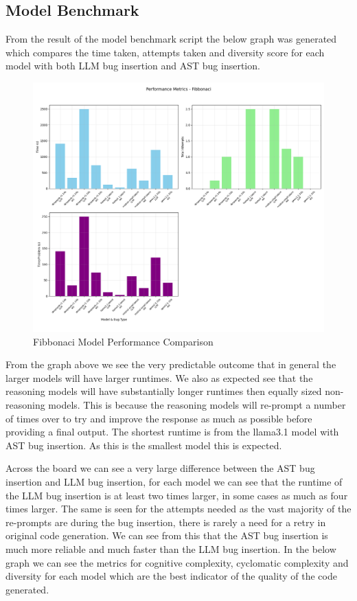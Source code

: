 \documentclass[12pt]{extarticle}
\begin{document}
\subsection{Model Benchmark}

From the result of the model benchmark script the below graph was generated which compares the time taken, attempts taken and diversity score for each model with both LLM bug insertion and AST bug insertion.

\begin{figure}[H]
\centering
\includegraphics[width=0.7\linewidth]{Images/Model_Comparison_Fibbonaci.png}
\caption{Fibbonaci Model Performance Comparison}
\label{fig:Model_Benchmark}
\end{figure}

From the graph above we see the very predictable outcome that in general the larger models will have larger runtimes. We also as expected see that the reasoning models will have substantially longer runtimes then equally sized non-reasoning models. This is because the reasoning models will re-prompt a number of times over to try and improve the response as much as possible before providing a final output. The shortest runtime is from the llama3.1 model with AST bug insertion. As this is the smallest model this is expected. 

Across the board we can see a very large difference between the AST bug insertion and LLM bug insertion, for each model we can see that the runtime of the LLM bug insertion is at least two times larger, in some cases as much as four times larger. The same is seen for the attempts needed as the vast majority of the re-prompts are during the bug insertion, there is rarely a need for a retry in original code generation. We can see from this that the AST bug insertion is much more reliable and much faster than the LLM bug insertion. In the below graph we can see the metrics for cognitive complexity, cyclomatic complexity and diversity for each model which are the best indicator of the quality of the code generated.
\end{document}
